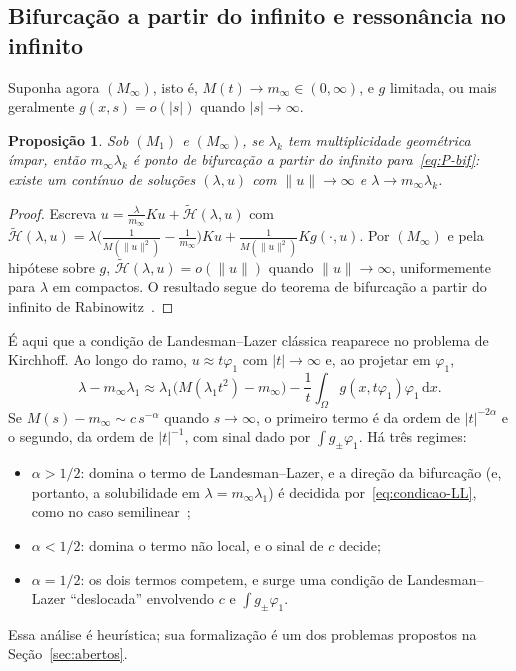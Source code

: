 \documentclass[11pt,a4paper]{article}
\theoremstyle{plain}
\newtheorem{proposicao}[teorema]{Proposição}
\theoremstyle{definition}
\theoremstyle{remark}
\newcommand{\norm}[1]{\lVert #1\rVert}
\newcommand{\abs}[1]{\lvert #1\rvert}
\newcommand{\dx}{\,\mathrm{d}x}
\begin{document}
\subsection{Bifurcação a partir do infinito e ressonância no infinito}\label{subsec:bif-infinito}

Suponha agora $(M_\infty)$, isto é, $M(t)\to m_\infty\in(0,\infty)$, e
$g$ limitada, ou mais geralmente $g(x,s)=o(\abs{s})$ quando
$\abs{s}\to\infty$.

\begin{proposicao}\label{prop:bif-infinito}
Sob $(M_1)$ e $(M_\infty)$, se $\lambda_k$ tem multiplicidade geométrica
ímpar, então $m_\infty\lambda_k$ é ponto de bifurcação a partir do infinito
para~\eqref{eq:P-bif}: existe um contínuo de soluções $(\lambda,u)$ com
$\norm{u}\to\infty$ e $\lambda\to m_\infty\lambda_k$.
\end{proposicao}

\begin{proof}
Escreva $u=\frac{\lambda}{m_\infty}Ku+\widetilde{\mathcal{H}}(\lambda,u)$ com
$\widetilde{\mathcal{H}}(\lambda,u)=\lambda\bigl(\frac{1}{M(\norm{u}^2)}-\frac{1}{m_\infty}\bigr)Ku
+\frac{1}{M(\norm{u}^2)}Kg(\cdot,u)$. Por $(M_\infty)$ e pela hipótese sobre $g$,
$\widetilde{\mathcal{H}}(\lambda,u)=o(\norm{u})$ quando $\norm{u}\to\infty$,
uniformemente para $\lambda$ em compactos. O resultado segue do teorema de
bifurcação a partir do infinito de Rabinowitz~\cite{Rabinowitz1973}.
\end{proof}

É aqui que a condição de Landesman--Lazer clássica reaparece no problema de
Kirchhoff. Ao longo do ramo, $u\approx t\varphi_1$ com $\abs{t}\to\infty$ e, ao
projetar em $\varphi_1$,
\begin{equation}\label{eq:direcao-infinito}
\lambda-m_\infty\lambda_1\approx
\lambda_1\bigl(M(\lambda_1t^2)-m_\infty\bigr)-\frac1t\int_\Omega g(x,t\varphi_1)\varphi_1\dx .
\end{equation}
Se $M(s)-m_\infty\sim c\,s^{-\alpha}$ quando $s\to\infty$, o primeiro termo é
da ordem de $\abs{t}^{-2\alpha}$ e o segundo, da ordem de $\abs{t}^{-1}$, com
sinal dado por $\int g_\pm\varphi_1$. Há três regimes:
\begin{itemize}[nosep]
\item $\alpha>1/2$: domina o termo de Landesman--Lazer, e a direção da
bifurcação (e, portanto, a solubilidade em $\lambda=m_\infty\lambda_1$) é
decidida por~\eqref{eq:condicao-LL}, como no caso semilinear~\cite{ArcoyaGamez2001};
\item $\alpha<1/2$: domina o termo não local, e o sinal de $c$ decide;
\item $\alpha=1/2$: os dois termos competem, e surge uma condição de
Landesman--Lazer ``deslocada'' envolvendo $c$ e $\int g_\pm\varphi_1$.
\end{itemize}
Essa análise é heurística; sua formalização é um dos problemas propostos na
Seção~\ref{sec:abertos}.
\end{document}
